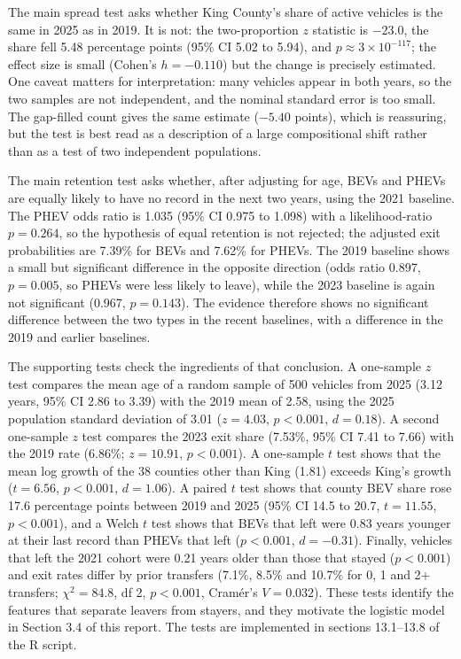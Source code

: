 \documentclass{xmum_asg}
\begin{document}
The main spread test asks whether King County's share of active vehicles is the same in 2025 as in 2019. It is not: the two-proportion $z$ statistic is $-23.0$, the share fell 5.48 percentage points (95\% CI 5.02 to 5.94), and $p\approx3\times10^{-117}$; the effect size is small (Cohen's $h=-0.110$) but the change is precisely estimated. One caveat matters for interpretation: many vehicles appear in both years, so the two samples are not independent, and the nominal standard error is too small. The gap-filled count gives the same estimate ($-5.40$ points), which is reassuring, but the test is best read as a description of a large compositional shift rather than as a test of two independent populations.

The main retention test asks whether, after adjusting for age, BEVs and PHEVs are equally likely to have no record in the next two years, using the 2021 baseline. The PHEV odds ratio is 1.035 (95\% CI 0.975 to 1.098) with a likelihood-ratio $p=0.264$, so the hypothesis of equal retention is not rejected; the adjusted exit probabilities are 7.39\% for BEVs and 7.62\% for PHEVs. The 2019 baseline shows a small but significant difference in the opposite direction (odds ratio 0.897, $p=0.005$, so PHEVs were less likely to leave), while the 2023 baseline is again not significant (0.967, $p=0.143$). The evidence therefore shows no significant difference between the two types in the recent baselines, with a difference in the 2019 and earlier baselines.

The supporting tests check the ingredients of that conclusion. A one-sample $z$ test compares the mean age of a random sample of 500 vehicles from 2025 (3.12 years, 95\% CI 2.86 to 3.39) with the 2019 mean of 2.58, using the 2025 population standard deviation of 3.01 ($z=4.03$, $p<0.001$, $d=0.18$). A second one-sample $z$ test compares the 2023 exit share (7.53\%, 95\% CI 7.41 to 7.66) with the 2019 rate (6.86\%; $z=10.91$, $p<0.001$). A one-sample $t$ test shows that the mean log growth of the 38 counties other than King (1.81) exceeds King's growth ($t=6.56$, $p<0.001$, $d=1.06$). A paired $t$ test shows that county BEV share rose 17.6 percentage points between 2019 and 2025 (95\% CI 14.5 to 20.7, $t=11.55$, $p<0.001$), and a Welch $t$ test shows that BEVs that left were 0.83 years younger at their last record than PHEVs that left ($p<0.001$, $d=-0.31$). Finally, vehicles that left the 2021 cohort were 0.21 years older than those that stayed ($p<0.001$) and exit rates differ by prior transfers (7.1\%, 8.5\% and 10.7\% for 0, 1 and 2+ transfers; $\chi^2=84.8$, df 2, $p<0.001$, Cram\'er's $V=0.032$). These tests identify the features that separate leavers from stayers, and they motivate the logistic model in Section 3.4 of this report. The tests are implemented in sections 13.1--13.8 of the R script.
\end{document}
